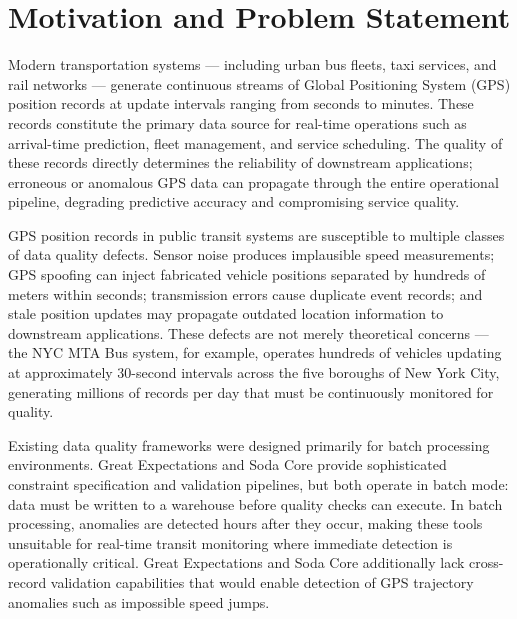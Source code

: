 
\section{Motivation and Problem Statement}
\label{sec:intro-motivation}

Modern transportation systems — including urban bus fleets, taxi services, and
rail networks — generate continuous streams of Global Positioning System (GPS)
position records at update intervals ranging from seconds to minutes. These records
constitute the primary data source for real-time operations such as arrival-time
prediction, fleet management, and service scheduling. The quality of these records
directly determines the reliability of downstream applications; erroneous or
anomalous GPS data can propagate through the entire operational pipeline,
degrading predictive accuracy and compromising service quality.

GPS position records in public transit systems are susceptible to multiple classes of
data quality defects. Sensor noise produces implausible speed measurements;
GPS spoofing can inject fabricated vehicle positions separated by hundreds of meters
within seconds; transmission errors cause duplicate event records; and stale
position updates may propagate outdated location information to downstream
applications. These defects are not merely theoretical concerns — the NYC MTA Bus
system, for example, operates hundreds of vehicles updating at approximately
30-second intervals across the five boroughs of New York City, generating
millions of records per day that must be continuously monitored for quality.

Existing data quality frameworks were designed primarily for batch processing
environments. Great Expectations \citep{great_expectations} and Soda Core
\citep{soda-core} provide sophisticated constraint specification and validation
pipelines, but both operate in batch mode: data must be written to a warehouse
before quality checks can execute. In batch processing, anomalies are detected
hours after they occur, making these tools unsuitable for real-time transit
monitoring where immediate detection is operationally critical. Great Expectations
and Soda Core additionally lack cross-record validation capabilities that would
enable detection of GPS trajectory anomalies such as impossible speed jumps.

